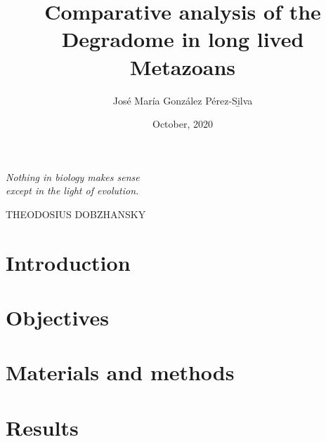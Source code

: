 \documentclass[12pt,twoside,openright]{book}
\title{Comparative analysis of the Degradome in long lived Metazoans}
\author{Jos\'{e} Mar\'{i}a Gonz\'{a}lez P\'{e}rez-S\b{i}lva}
\date{October, 2020}
\newlength\longest
\begin{document}
\raggedbottom %

\frontmatter
\pagestyle{empty}

\cleardoublepage

\cleardoublepage




\cleardoublepage
\thispagestyle{empty}


\cleardoublepage
\thispagestyle{plain}
\null\vfill
\settowidth{}
\begin{center}
    \parbox{\longest}{
        \raggedright{\Large\itshape
        Nothing in biology makes sense \\
        except in the light of evolution.\par\bigskip}   
        \raggedleft\large\MakeUppercase{Theodosius Dobzhansky}\par
    }
\end{center}
\vfill\vfill

\tableofcontents
\listoffigures
\listoftables
\printnomenclature[2cm]

\mainmatter
\pagestyle{fancy}

\chapter{Introduction}





\chapter{Objectives}



\chapter{Materials and methods}



\chapter{Results}


\end{document}
